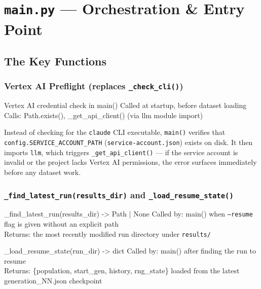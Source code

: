 \documentclass[11pt,a4paper]{report}
\newcommand{\fn}[1]{\texttt{#1}}
\newcommand{\pyf}[1]{\texttt{#1}}
\begin{document}
\chapter{\pyf{main.py} --- Orchestration \& Entry Point}

\section{The Key Functions}

\subsection{Vertex AI Preflight (replaces \fn{\_check\_cli()})}

\begin{spec}{Vertex AI credential check in main()}
Called at startup, before dataset loading \\
Calls: Path.exists(), \_get\_api\_client() (via llm module import)
\end{spec}

Instead of checking for the \fn{claude} CLI executable, \fn{main()} verifies that
\fn{config.SERVICE\_ACCOUNT\_PATH} (\fn{service-account.json}) exists on disk.  It
then imports \fn{llm}, which triggers \fn{\_get\_api\_client()} --- if the service
account is invalid or the project lacks Vertex AI permissions, the error surfaces
immediately before any dataset work.

\subsection{\fn{\_find\_latest\_run(results\_dir)} and \fn{\_load\_resume\_state()}}

\begin{spec}{\_find\_latest\_run(results\_dir) -> Path | None}
Called by: main() when \fn{--resume} flag is given without an explicit path \\
Returns: the most recently modified run directory under \fn{results/}
\end{spec}

\begin{spec}{\_load\_resume\_state(run\_dir) -> dict}
Called by: main() after finding the run to resume \\
Returns: \{population, start\_gen, history, rng\_state\} loaded from the latest
generation\_NN.json checkpoint
\end{spec}
\end{document}
